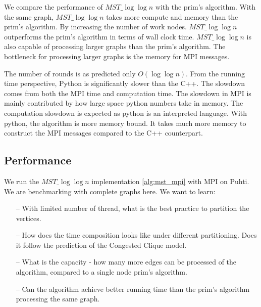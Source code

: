 \documentclass[english, 12pt, a4paper, elec, utf8, a-2b, online]{aaltothesis}
\newcommand{\mstalgo}{$MST\_\log\log{n}$}
\begin{document}


We compare the performance of \mstalgo{} with the prim's algorithm. With the same graph, \mstalgo{} takes more compute and memory than the prim's algorithm. By increasing the number of work nodes. \mstalgo{} outperforms the prim's algorithm in terms of wall clock time. \mstalgo{} is also capable of processing larger graphs than the prim's algorithm. The bottleneck for processing larger graphs is the memory for MPI messages.


The number of rounds is as predicted only $O(\log{\log{n}})$. From the running time perspective, Python is significantly slower than the C++. The slowdown comes from both the MPI time and computation time. The slowdown in MPI is mainly contributed by how large space python numbers take in memory. The computation slowdown is expected as python is an interpreted language. With python, the algorithm is more memory bound. It takes much more memory to construct the MPI messages compared to the C++ counterpart.
\subsection{Performance}
We run the \mstalgo{} implementation \cref{alg:mst_mpi} with MPI on Puhti. We are benchmarking with complete graphs here. We want to learn:

\begin{itemize}
	\item[--] With limited number of thread, what is the best practice to partition the vertices.
	\item[--] How does the time composition looks like under different partitioning. Does it follow the prediction of the Congested Clique model.
	\item[--] What is the capacity - how many more edges can be processed of the algorithm, compared to a single node prim's algorithm.
	\item[--] Can the algorithm achieve better running time than the prim's algorithm processing the same graph.
\end{itemize}
\end{document}
